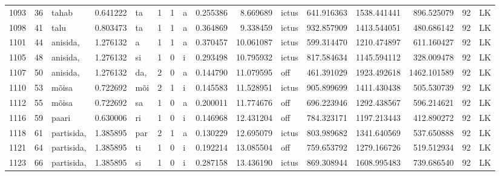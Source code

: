 \begin{tabular}{lrlrllllrrlrrrll}
1093 &          36 &            tahab &  0.641222 &      ta &        1 &      1 &       a &      0.255386 &      8.669689 &  ictus &   641.916363 &  1538.441441 &   896.525079 &     92 &        LK \\
1098 &          41 &             talu &  0.803473 &      ta &        1 &      1 &       a &      0.364869 &      9.338459 &  ictus &   932.857909 &  1413.544051 &   480.686142 &     92 &        LK \\
1101 &          44 &         anisida, &  1.276132 &       a &        1 &      1 &       a &      0.370457 &     10.061087 &  ictus &   599.314470 &  1210.474897 &   611.160427 &     92 &        LK \\
1105 &          48 &         anisida, &  1.276132 &      si &        1 &      0 &       i &      0.293498 &     10.795932 &  ictus &   817.584634 &  1145.594112 &   328.009478 &     92 &        LK \\
1107 &          50 &         anisida, &  1.276132 &     da, &        2 &      0 &       a &      0.144790 &     11.079595 &    off &   461.391029 &  1923.492618 &  1462.101589 &     92 &        LK \\
1110 &          53 &            mõisa &  0.722692 &     mõi &        2 &      1 &       i &      0.145583 &     11.528951 &  ictus &   905.899699 &  1411.430438 &   505.530739 &     92 &        LK \\
1112 &          55 &            mõisa &  0.722692 &      sa &        1 &      0 &       a &      0.200011 &     11.774676 &    off &   696.223946 &  1292.438567 &   596.214621 &     92 &        LK \\
1116 &          59 &            paari &  0.630006 &      ri &        1 &      0 &       i &      0.146968 &     12.431204 &    off &   784.323171 &  1197.213443 &   412.890272 &     92 &        LK \\
1118 &          61 &       partisida, &  1.385895 &     par &        2 &      1 &       a &      0.130229 &     12.695079 &  ictus &   803.989682 &  1341.640569 &   537.650888 &     92 &        LK \\
1121 &          64 &       partisida, &  1.385895 &      ti &        1 &      0 &       i &      0.192214 &     13.085504 &    off &   759.653792 &  1279.166726 &   519.512934 &     92 &        LK \\
1123 &          66 &       partisida, &  1.385895 &      si &        1 &      0 &       i &      0.287158 &     13.436190 &  ictus &   869.308944 &  1608.995483 &   739.686540 &     92 &        LK \\

\end{tabular}
